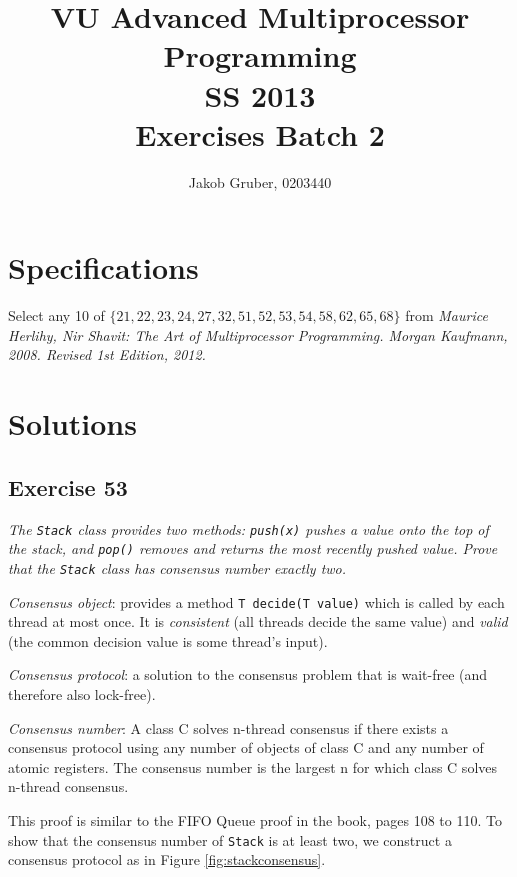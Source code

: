 \documentclass[a4paper,10pt]{article}
\title{VU Advanced Multiprocessor Programming \\
       SS 2013 \\
       Exercises Batch 2}
\author{Jakob Gruber, 0203440}
\begin{document}
\maketitle

\tableofcontents

\pagebreak

\section{Specifications}

Select any 10 of $\{21, 22, 23, 24, 27, 32, 51, 52, 53, 54, 58, 62, 65, 68\}$ 
from \emph{Maurice Herlihy, Nir Shavit: The Art of Multiprocessor Programming. 
Morgan Kaufmann, 2008. Revised 1st Edition, 2012.}

\section{Solutions}

\subsection{Exercise 53}

\emph{The \lstinline|Stack| class provides two methods: \lstinline|push(x)| pushes a value onto the top of the stack, and \lstinline|pop()| removes and returns the most recently pushed value. Prove that the \lstinline|Stack| class has consensus number exactly two.}

\vspace{3mm}

\emph{Consensus object}: provides a method \lstinline|T decide(T value)| which is called by each thread at most once. It is \emph{consistent} (all threads decide the same value) and \emph{valid} (the common decision value is some thread's input).

\emph{Consensus protocol}: a solution to the consensus problem that is wait-free (and therefore also lock-free).

\emph{Consensus number}: A class C solves n-thread consensus if there exists a consensus protocol using any number of objects of class C and any number of atomic registers. The consensus number is the largest n for which class C solves n-thread consensus.

This proof is similar to the FIFO Queue proof in the book, pages 108 to 110. To show that the consensus number of \lstinline|Stack| is at least two, we construct a consensus protocol as in Figure \ref{fig:stackconsensus}.
\end{document}
